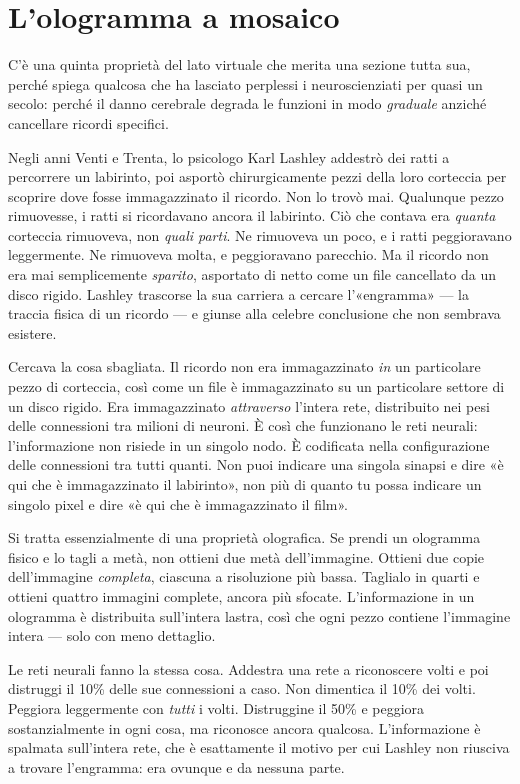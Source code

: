 \documentclass[11pt, twoside, openright]{book}
\begin{document}
\section*{L'ologramma a mosaico}

C'è una quinta proprietà del lato virtuale che merita una sezione tutta sua, perché spiega qualcosa che ha lasciato perplessi i neuroscienziati per quasi un secolo: perché il danno cerebrale degrada le funzioni in modo \textit{graduale} anziché cancellare ricordi specifici.

Negli anni Venti e Trenta, lo psicologo Karl Lashley addestrò dei ratti a percorrere un labirinto, poi asportò chirurgicamente pezzi della loro corteccia per scoprire dove fosse immagazzinato il ricordo. Non lo trovò mai. Qualunque pezzo rimuovesse, i ratti si ricordavano ancora il labirinto. Ciò che contava era \textit{quanta} corteccia rimuoveva, non \textit{quali parti}. Ne rimuoveva un poco, e i ratti peggioravano leggermente. Ne rimuoveva molta, e peggioravano parecchio. Ma il ricordo non era mai semplicemente \textit{sparito}, asportato di netto come un file cancellato da un disco rigido. Lashley trascorse la sua carriera a cercare l'«engramma» --- la traccia fisica di un ricordo --- e giunse alla celebre conclusione che non sembrava esistere.

Cercava la cosa sbagliata. Il ricordo non era immagazzinato \textit{in} un particolare pezzo di corteccia, così come un file è immagazzinato su un particolare settore di un disco rigido. Era immagazzinato \textit{attraverso} l'intera rete, distribuito nei pesi delle connessioni tra milioni di neuroni. È così che funzionano le reti neurali: l'informazione non risiede in un singolo nodo. È codificata nella configurazione delle connessioni tra tutti quanti. Non puoi indicare una singola sinapsi e dire «è qui che è immagazzinato il labirinto», non più di quanto tu possa indicare un singolo pixel e dire «è qui che è immagazzinato il film».

Si tratta essenzialmente di una proprietà olografica. Se prendi un ologramma fisico e lo tagli a metà, non ottieni due metà dell'immagine. Ottieni due copie dell'immagine \textit{completa}, ciascuna a risoluzione più bassa. Taglialo in quarti e ottieni quattro immagini complete, ancora più sfocate. L'informazione in un ologramma è distribuita sull'intera lastra, così che ogni pezzo contiene l'immagine intera --- solo con meno dettaglio.

Le reti neurali fanno la stessa cosa. Addestra una rete a riconoscere volti e poi distruggi il 10\% delle sue connessioni a caso. Non dimentica il 10\% dei volti. Peggiora leggermente con \textit{tutti} i volti. Distruggine il 50\% e peggiora sostanzialmente in ogni cosa, ma riconosce ancora qualcosa. L'informazione è spalmata sull'intera rete, che è esattamente il motivo per cui Lashley non riusciva a trovare l'engramma: era ovunque e da nessuna parte.
\end{document}
